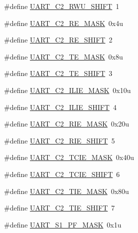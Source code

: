 \begin{DoxyCompactItemize}
\#define \hyperlink{group___u_a_r_t___register___masks_gaa163993d547a96c2ea002ff52e6b0971}{U\+A\+R\+T\+\_\+\+C2\+\_\+\+R\+W\+U\+\_\+\+S\+H\+I\+FT}~1
\item 
\#define \hyperlink{group___u_a_r_t___register___masks_ga181a8e8fd0f780d45f1bff7c76836fe5}{U\+A\+R\+T\+\_\+\+C2\+\_\+\+R\+E\+\_\+\+M\+A\+SK}~0x4u
\item 
\#define \hyperlink{group___u_a_r_t___register___masks_ga65bf907ff7aaa0afeb5a3c34ff3a4b2c}{U\+A\+R\+T\+\_\+\+C2\+\_\+\+R\+E\+\_\+\+S\+H\+I\+FT}~2
\item 
\#define \hyperlink{group___u_a_r_t___register___masks_ga3ac02e42b689641339aadf50ba868492}{U\+A\+R\+T\+\_\+\+C2\+\_\+\+T\+E\+\_\+\+M\+A\+SK}~0x8u
\item 
\#define \hyperlink{group___u_a_r_t___register___masks_ga249d6d4f12178dac9cb19afecf1b165c}{U\+A\+R\+T\+\_\+\+C2\+\_\+\+T\+E\+\_\+\+S\+H\+I\+FT}~3
\item 
\#define \hyperlink{group___u_a_r_t___register___masks_ga646831f578232754b613c506d70eb282}{U\+A\+R\+T\+\_\+\+C2\+\_\+\+I\+L\+I\+E\+\_\+\+M\+A\+SK}~0x10u
\item 
\#define \hyperlink{group___u_a_r_t___register___masks_gaccb0ebb3f9bca9de659c4935cd895b06}{U\+A\+R\+T\+\_\+\+C2\+\_\+\+I\+L\+I\+E\+\_\+\+S\+H\+I\+FT}~4
\item 
\#define \hyperlink{group___u_a_r_t___register___masks_gaa2cb31ebff38bb70191a8852eb0216aa}{U\+A\+R\+T\+\_\+\+C2\+\_\+\+R\+I\+E\+\_\+\+M\+A\+SK}~0x20u
\item 
\#define \hyperlink{group___u_a_r_t___register___masks_ga586c552161616eeaf685b689dde5543a}{U\+A\+R\+T\+\_\+\+C2\+\_\+\+R\+I\+E\+\_\+\+S\+H\+I\+FT}~5
\item 
\#define \hyperlink{group___u_a_r_t___register___masks_ga74dd6677d7d42454ae44951e847f13bc}{U\+A\+R\+T\+\_\+\+C2\+\_\+\+T\+C\+I\+E\+\_\+\+M\+A\+SK}~0x40u
\item 
\#define \hyperlink{group___u_a_r_t___register___masks_ga65e55db1b4ca8940fee39d77256fbcaf}{U\+A\+R\+T\+\_\+\+C2\+\_\+\+T\+C\+I\+E\+\_\+\+S\+H\+I\+FT}~6
\item 
\#define \hyperlink{group___u_a_r_t___register___masks_ga0b4f935e44fda4076d7c8964c9d1e409}{U\+A\+R\+T\+\_\+\+C2\+\_\+\+T\+I\+E\+\_\+\+M\+A\+SK}~0x80u
\item 
\#define \hyperlink{group___u_a_r_t___register___masks_gaa216636f49f8f34524a376362792be1c}{U\+A\+R\+T\+\_\+\+C2\+\_\+\+T\+I\+E\+\_\+\+S\+H\+I\+FT}~7
\item 
\#define \hyperlink{group___u_a_r_t___register___masks_ga4116bba67a2cf49c9623e62e3b499ee3}{U\+A\+R\+T\+\_\+\+S1\+\_\+\+P\+F\+\_\+\+M\+A\+SK}~0x1u

\end{DoxyCompactItemize}
